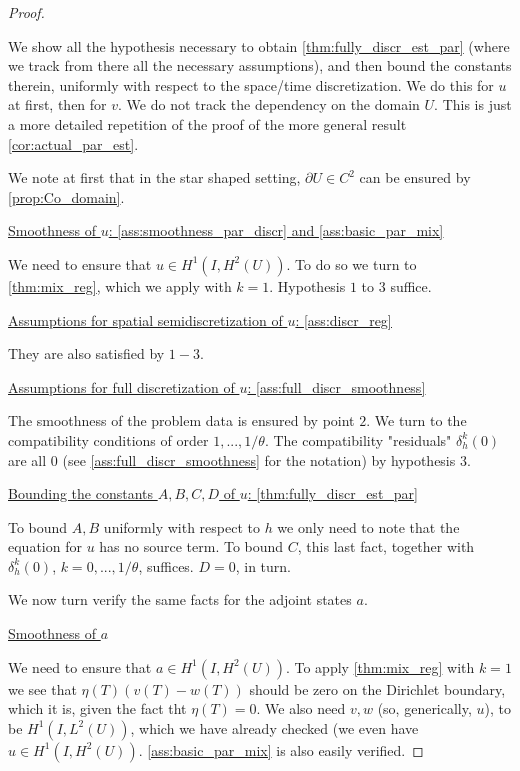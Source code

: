 \documentclass[english,a4paper,10pt,oneside]{scrbook}	%
\theoremstyle{break}
\newenvironment{mproof}[1][\proofname]{%
  \begin{proof}[#1]$ $\par\nobreak\ignorespaces
}{%
  \end{proof}
}
\renewcommand*{\proofname}{Proof}
\theoremstyle{remark}
\begin{document}
\begin{mproof}

We show all the hypothesis necessary to obtain \cref{thm:fully_discr_est_par} (where we track from there all the necessary assumptions), and then bound the constants therein, uniformly with respect to the space/time discretization. We do this for $u$ at first, then for $v$. We do not track the dependency on the domain $U$. This is just a more detailed repetition of the proof of the more general result \cref{cor:actual_par_est}.

We note at first that in the star shaped setting, $\partial U \in C^2$ can be ensured by \cref{prop:Co_domain}.

\underline{Smoothness of $u$: \cref{ass:smoothness_par_discr} and  \cref{ass:basic_par_mix}}

We need to ensure that $u \in H^1(I,H^2(U))$. To do so we turn to \cref{thm:mix_reg}, which we apply with $k=1$. Hypothesis $1$ to $3$ suffice. 

\underline{Assumptions for spatial semidiscretization of $u$: \cref{ass:discr_reg}}

They are also satisfied by $1-3$.

\underline{Assumptions for full discretization of $u$: \cref{ass:full_discr_smoothness}}

The smoothness of the problem data is ensured by point $2$. We turn to the compatibility conditions of order $1,...,1/\theta$. The compatibility "residuals" $\delta_h^k(0)$ are all $0$ (see \cref{ass:full_discr_smoothness} for the notation) by hypothesis $3$.

\underline{Bounding the constants $A,B,C,D$ of $u$: \cref{thm:fully_discr_est_par}}

To bound $A,B$ uniformly with respect to $h$ we only need to note that the equation for $u$ has no source term. To bound $C$, this last fact, together with $\delta_h^k(0)$, $k=0,...,1/\theta$, suffices. $D=0$, in turn.

We now turn verify the same facts for the adjoint states $a$.

\underline{Smoothness of $a$}

We need to ensure that $a \in H^1(I,H^2(U))$. To apply \cref{thm:mix_reg} with $k=1$ we see that $\eta(T)(v(T)-w(T))$ should be zero on the Dirichlet boundary, which it is, given the fact tht $\eta(T)=0$. We also need $v,w$ (so, generically, $u$), to be $H^1(I, L^2(U))$, which we have already checked (we even have $u \in H^1(I,H^2(U))$.  \cref{ass:basic_par_mix} is also easily verified.


\end{mproof}
\end{document}
